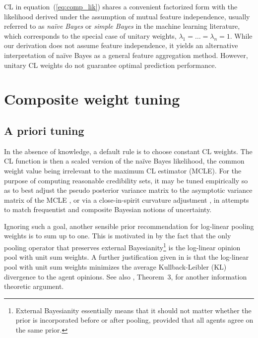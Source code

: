 \documentclass[english]{scrartcl}
\begin{document}
CL in equation~(\ref{eq:comp_lik}) shares a convenient factorized form with the likelihood derived under the assumption of mutual feature independence, usually referred to as {\em na\"ive Bayes} or {\em simple Bayes} in the machine learning literature, which corresponds to the special case of unitary weights, $\lambda_1=\ldots=\lambda_n= 1$. While our derivation does not assume feature independence, it yields an alternative interpretation of na\"ive Bayes as a general feature aggregation method. However, unitary CL weights do not guarantee optimal prediction performance.


\section{Composite weight tuning}

\subsection{A priori tuning}


In the absence of knowledge, a default rule is to choose constant CL weights. The CL function is then a scaled version of the na\"ive Bayes likelihood, the common weight value being irrelevant to the maximum CL estimator (MCLE). For the purpose of computing reasonable credibility sets, it may be tuned empirically so as to best adjust the pseudo posterior variance matrix to the asymptotic variance matrix of the MCLE \cite{Pauli-11}, or via a close-in-spirit curvature adjustment \cite{Ribatet-12}, in attempts to match frequentist and composite Bayesian notions of uncertainty.

Ignoring such a goal, another sensible prior recommendation for log-linear pooling weights is to sum up to one. This is motivated in \cite{Genest-86b} by the fact that the only pooling operator that preserves external Bayesianity\footnote{External Bayesianity essentially means that it should not matter whether the prior is incorporated before or after pooling, provided that all agents agree on the same prior.} is the log-linear opinion pool with unit sum weights. A further justification given in \cite{Garg-04} is that the log-linear pool with unit sum weights minimizes the average Kullback-Leibler (KL) divergence to the agent opinions. See also \cite{Wang-14}, Theorem~3, for another information theoretic argument.
\end{document}
